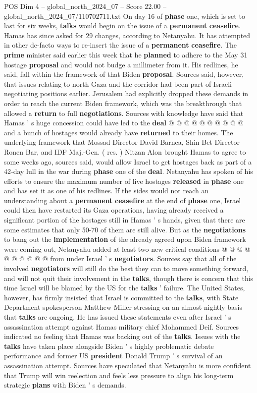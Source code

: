 \begin{textsample}{POS Dim 4 – global\_north\_2024\_07 – Score 22.00 – global\_north\_2024\_07/110702711.txt}
On day 16 of \textbf{phase} one, which is set to last for six weeks, \textbf{talks} would begin on the issue of a \textbf{permanent} \textbf{ceasefire}.
Hamas has since asked for 29 changes, according to Netanyahu.
It has attempted in other de-facto ways to re-insert the issue of a \textbf{permanent} \textbf{ceasefire}.
The \textbf{prime} minister said earlier this week that he \textbf{planned} to adhere to the May 31 hostage \textbf{proposal} and would not budge a millimeter from it.
His redlines, he said, fall within the framework of that Biden \textbf{proposal}.
Sources said, however, that issues relating to north Gaza and the corridor had been part of Israeli negotiating positions earlier.
Jerusalem had explicitly dropped these demands in order to reach the current Biden framework, which was the breakthrough that allowed a \textbf{return} to full \textbf{negotiations}.
Sources with knowledge have said that Hamas ' s huge concession could have led to the \textbf{deal} @ @ @ @ @ @ @ @ @ @ and a bunch of hostages would already have \textbf{returned} to their homes.
The underlying framework that Mossad Director David Barnea, Shin Bet Director Ronen Bar, and IDF Maj.-Gen. ( res. ) Nitzan Alon brought Hamas to agree to some weeks ago, sources said, would allow Israel to get hostages back as part of a 42-day lull in the war during \textbf{phase} one of the \textbf{deal}.
Netanyahu has spoken of his efforts to ensure the maximum number of live hostages \textbf{released} in \textbf{phase} one and has set it as one of his redlines.
If the sides would not reach an understanding about a \textbf{permanent} \textbf{ceasefire} at the end of \textbf{phase} one, Israel could then have restarted its Gaza operations, having already received a significant portion of the hostages still in Hamas ' s hands, given that there are some estimates that only 50-70 of them are still alive.
But as the \textbf{negotiations} to bang out the \textbf{implementation} of the already agreed upon Biden framework were coming out, Netanyahu added at least two new critical conditions @ @ @ @ @ @ @ @ @ @ from under Israel ' s \textbf{negotiators}.
Sources say that all of the involved \textbf{negotiators} will still do the best they can to move something forward, and will not quit their involvement in the \textbf{talks}, though there is concern that this time Israel will be blamed by the US for the \textbf{talks} ' failure.
The United States, however, has firmly insisted that Israel is committed to the \textbf{talks}, with State Department spokesperson Matthew Miller stressing on an almost nightly basis that \textbf{talks} are ongoing.
He has issued these statements even after Israel ' s assassination attempt against Hamas military chief Mohammed Deif.
Sources indicated no feeling that Hamas was backing out of the \textbf{talks}.
Issues with the \textbf{talks} have taken place alongside Biden ' s highly problematic debate performance and former US \textbf{president} Donald Trump ' s survival of an assassination attempt.
Sources have speculated that Netanyahu is more confident that Trump will win reelection and feels less pressure to align his long-term strategic \textbf{plans} with Biden ' s demands.


\end{textsample}
